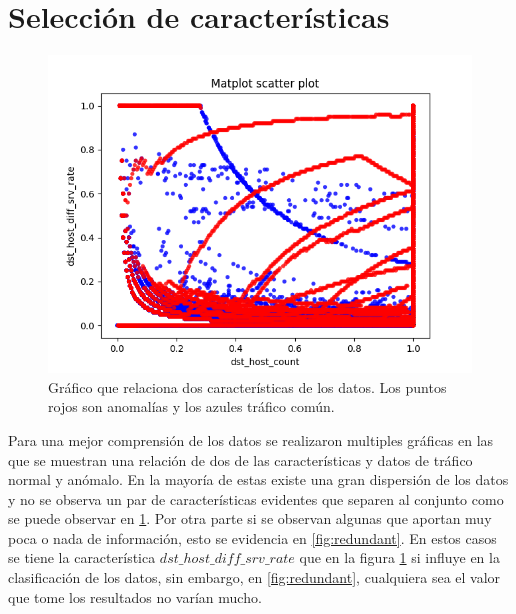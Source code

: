 
\section{Selección de características}
\begin{figure}[b]
    \includegraphics[width=\linewidth]{Images/dst_host_count-dst_host_diff_srv_rate.png}
    \caption{Gráfico que relaciona dos características de los datos. Los puntos rojos son anomalías y los azules tráfico común.}
    \label{fig:entropy}
\end{figure}
Para una mejor comprensión de los datos se realizaron multiples gráficas en las que se muestran una relación de dos de las características y datos de tráfico normal y anómalo. En la mayoría de estas existe una gran dispersión de los datos y no se observa un par de características evidentes que separen al conjunto como se puede observar en \ref{fig:entropy}. Por otra parte si se observan algunas que aportan muy poca o nada de información, esto se evidencia en \ref{fig:redundant}. En estos casos se tiene la característica $dst\_host\_diff\_srv\_rate$ que en la figura \ref{fig:entropy} si influye en la clasificación de los datos, sin embargo, en \ref{fig:redundant}, cualquiera sea el valor que tome los resultados no varían mucho.

